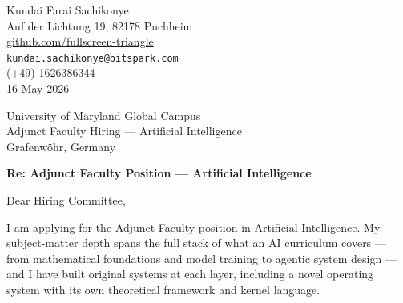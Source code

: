 \documentclass[12pt,a4paper]{article}
\begin{document}
\begin{flushright}
Kundai Farai Sachikonye \\
Auf der Lichtung 19, 82178 Puchheim \\
\href{https://github.com/fullscreen-triangle}{github.com/fullscreen-triangle} \\
\texttt{kundai.sachikonye@bitspark.com} \\
(+49) 1626386344 \\[6pt]
16 May 2026
\end{flushright}

\vspace{1em}

University of Maryland Global Campus \\
Adjunct Faculty Hiring --- Artificial Intelligence \\
Grafenwöhr, Germany

\vspace{1.5em}

\textbf{Re: Adjunct Faculty Position --- Artificial Intelligence}

\vspace{1em}

Dear Hiring Committee,

I am applying for the Adjunct Faculty position in Artificial Intelligence. My
subject-matter depth spans the full stack of what an AI curriculum covers ---
from mathematical foundations and model training to agentic system design ---
and I have built original systems at each layer, including a novel operating system
with its own theoretical framework and kernel language.
\end{document}
